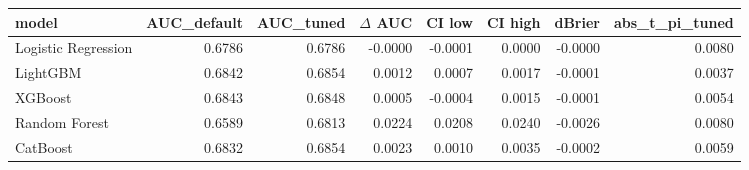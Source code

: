 \begin{tabular}{lrrrrrrr}
\toprule
model & AUC\_default & AUC\_tuned & $\Delta$ AUC & CI low & CI high & dBrier & abs\_t\_pi\_tuned \\
\midrule
Logistic Regression & 0.6786 & 0.6786 & -0.0000 & -0.0001 & 0.0000 & -0.0000 & 0.0080 \\
LightGBM & 0.6842 & 0.6854 & 0.0012 & 0.0007 & 0.0017 & -0.0001 & 0.0037 \\
XGBoost & 0.6843 & 0.6848 & 0.0005 & -0.0004 & 0.0015 & -0.0001 & 0.0054 \\
Random Forest & 0.6589 & 0.6813 & 0.0224 & 0.0208 & 0.0240 & -0.0026 & 0.0080 \\
CatBoost & 0.6832 & 0.6854 & 0.0023 & 0.0010 & 0.0035 & -0.0002 & 0.0059 \\
\bottomrule
\end{tabular}
